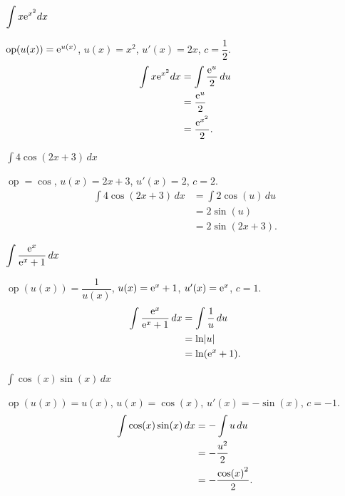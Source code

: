 \documentclass{beamer}
\newcommand{\Left} {\mathopen{}\mathclose\bgroup\left}
\newcommand{\Right}{\aftergroup\egroup\right}
\newcommand{\e}{\textup e}
\newcommand{\op}  {\operatorname{op}}
\theoremstyle{remark}
\begin{document}
\begin{CJK}{UTF8}{bsmi}
\begin{frame}{$\displaystyle \int x\e^{x^2} dx$}
  \begin{solution}
    $\op(u(x)) = \e^{u(x)}$, $u(x) = x^2$, $u'(x) = 2x$, $c = \dfrac12$.
    \begin{align*}
      \int x\e^{x^2} dx &= \int \frac{\e^u}{2}\,du\\
	&= \frac{\e^u}{2}\\
	&= \frac{\e^{x^2}}{2}.
    \end{align*}
  \end{solution}
\end{frame}

\begin{frame}{$\displaystyle \int 4\cos(2x+3)\,dx$}
  \begin{solution}
    $\op = \cos$, $u(x) = 2x+3$, $u'(x) = 2$, $c = 2$.
    \begin{align*}
      \int 4\cos(2x+3)\,dx &= \int 2\cos(u)\,du\\
	&= 2\sin(u)\\
	&= 2\sin(2x+3).
    \end{align*}
  \end{solution}
\end{frame}

\begin{frame}{$\displaystyle \int \frac{\e^x}{\e^x + 1}\,dx$}
  \begin{solution}
    $\op(u(x)) = \dfrac{1}{u(x)}$, $u(x) = \e^x + 1$, $u'(x) = \e^x$, $c = 1$.
    \begin{align*}
      \int \frac{\e^x}{\e^x + 1}\,dx &= \int \frac1u\,du\\
	&= \ln \Left| u \Right|\\
	&= \ln(\e^x + 1).
    \end{align*}
  \end{solution}
\end{frame}

\begin{frame}{$\displaystyle \int \cos(x) \sin(x)\,dx$}
  \begin{solution}
    $\op(u(x)) = u(x)$, $u(x) = \cos(x)$, $u'(x) = -\sin(x)$, $c = -1$.
    \begin{align*}
      \int \cos(x) \sin(x)\,dx &= -\int u\,du\\
	&= -\frac{u^2}{2}\\
	&= -\frac{\cos \Left( x \Right)^2}{2}.
    \end{align*}
  \end{solution}
\end{frame}


\end{CJK}
\end{document}
